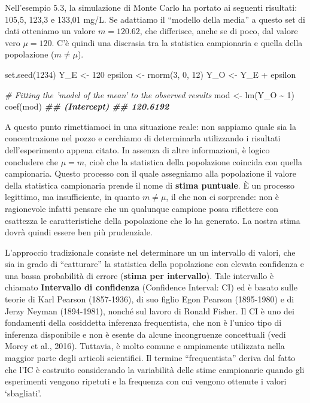 \documentclass[
  12pt,
]{book}
\newenvironment{Shaded}{\begin{snugshade}}{\end{snugshade}}
\newcommand{\CommentTok}[1]{\textcolor[rgb]{0.56,0.35,0.01}{\textit{#1}}}
\newcommand{\DecValTok}[1]{\textcolor[rgb]{0.00,0.00,0.81}{#1}}
\newcommand{\DocumentationTok}[1]{\textcolor[rgb]{0.56,0.35,0.01}{\textbf{\textit{#1}}}}
\newcommand{\FunctionTok}[1]{\textcolor[rgb]{0.00,0.00,0.00}{#1}}
\newcommand{\NormalTok}[1]{#1}
\newcommand{\OtherTok}[1]{\textcolor[rgb]{0.56,0.35,0.01}{#1}}
\newcommand{\SpecialCharTok}[1]{\textcolor[rgb]{0.00,0.00,0.00}{#1}}
\begin{document}
Nell'esempio 5.3, la simulazione di Monte Carlo ha portato ai seguenti risultati: 105,5, 123,3 e 133,01 mg/L. Se adattiamo il ``modello della media'' a questo set di dati otteniamo un valore \(m = 120.62\), che differisce, anche se di poco, dal valore vero \(\mu = 120\). C'è quindi una discrasia tra la statistica campionaria e quella della popolazione (\(m \neq \mu\)).

\begin{Shaded}
\begin{Highlighting}[]
\FunctionTok{set.seed}\NormalTok{(}\DecValTok{1234}\NormalTok{)}
\NormalTok{Y\_E }\OtherTok{\textless{}{-}} \DecValTok{120}
\NormalTok{epsilon }\OtherTok{\textless{}{-}} \FunctionTok{rnorm}\NormalTok{(}\DecValTok{3}\NormalTok{, }\DecValTok{0}\NormalTok{, }\DecValTok{12}\NormalTok{)}
\NormalTok{Y\_O }\OtherTok{\textless{}{-}}\NormalTok{ Y\_E }\SpecialCharTok{+}\NormalTok{ epsilon}

\CommentTok{\# Fitting the ’model of the mean’ to the observed results}
\NormalTok{mod }\OtherTok{\textless{}{-}} \FunctionTok{lm}\NormalTok{(Y\_O }\SpecialCharTok{\textasciitilde{}} \DecValTok{1}\NormalTok{)}
\FunctionTok{coef}\NormalTok{(mod)}
\DocumentationTok{\#\# (Intercept) }
\DocumentationTok{\#\#    120.6192}
\end{Highlighting}
\end{Shaded}

A questo punto rimettiamoci in una situazione reale: non sappiamo quale sia la concentrazione nel pozzo e cerchiamo di determinarla utilizzando i risultati dell'esperimento appena citato. In assenza di altre informazioni, è logico concludere che \(\mu = m\), cioè che la statistica della popolazione coincida con quella campionaria. Questo processo con il quale assegniamo alla popolazione il valore della statistica campionaria prende il nome di \textbf{stima puntuale}. È un processo legittimo, ma insufficiente, in quanto \(m \neq \mu\), il che non ci sorprende: non è ragionevole infatti pensare che un qualunque campione possa riflettere con esattezza le caratteristiche della popolazione che lo ha generato. La nostra stima dovrà quindi essere ben più prudenziale.

L'approccio tradizionale consiste nel determinare un un intervallo di valori, che sia in grado di ``catturare'' la statistica della popolazione con elevata confidenza e una bassa probabilità di errore (\textbf{stima per intervallo}). Tale intervallo è chiamato \textbf{Intervallo di confidenza} (Confidence Interval: CI) ed è basato sulle teorie di Karl Pearson (1857-1936), di suo figlio Egon Pearson (1895-1980) e di Jerzy Neyman (1894-1981), nonché sul lavoro di Ronald Fisher. Il CI è uno dei fondamenti della cosiddetta inferenza frequentista, che non è l'unico tipo di inferenza disponibile e non è esente da alcune incongruenze concettuali (vedi Morey et al., 2016). Tuttavia, è molto comune e ampiamente utilizzata nella maggior parte degli articoli scientifici. Il termine ``frequentista'' deriva dal fatto che l'IC è costruito considerando la variabilità delle stime campionarie quando gli esperimenti vengono ripetuti e la frequenza con cui vengono ottenute i valori `sbagliati'.
\end{document}

